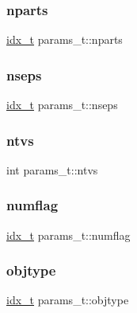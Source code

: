 \subsubsection{\texorpdfstring{nparts}{nparts}}
{\footnotesize\ttfamily \hyperlink{a00876_aaa5262be3e700770163401acb0150f52}{idx\+\_\+t} params\+\_\+t\+::nparts}

\mbox{\label{a00706_aca462caf8892eebb362d299b04c98d4a}} 
\subsubsection{\texorpdfstring{nseps}{nseps}}
{\footnotesize\ttfamily \hyperlink{a00876_aaa5262be3e700770163401acb0150f52}{idx\+\_\+t} params\+\_\+t\+::nseps}

\mbox{\label{a00706_ab2da6f80957f716f3f7d80bb05359125}} 
\subsubsection{\texorpdfstring{ntvs}{ntvs}}
{\footnotesize\ttfamily int params\+\_\+t\+::ntvs}

\mbox{\label{a00706_a68f7037e806032fd96d164314c864f2b}} 
\subsubsection{\texorpdfstring{numflag}{numflag}}
{\footnotesize\ttfamily \hyperlink{a00876_aaa5262be3e700770163401acb0150f52}{idx\+\_\+t} params\+\_\+t\+::numflag}

\mbox{\label{a00706_a7b7af066a4277901bf00461c9068e2d4}} 
\subsubsection{\texorpdfstring{objtype}{objtype}}
{\footnotesize\ttfamily \hyperlink{a00876_aaa5262be3e700770163401acb0150f52}{idx\+\_\+t} params\+\_\+t\+::objtype}

